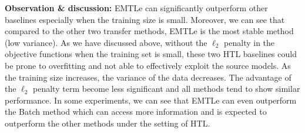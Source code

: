 \textbf{Observation \& discussion:} EMTLe can significantly outperform other baselines especially when the training size is small. Moreover, we can see that compared to the other two transfer methods, EMTLe is the most stable method (low variance). As we have discussed above, without the $\ell_2$ penalty in the objective functions when the training set is small, these two HTL baselines could be prone to overfitting and not able to effectively exploit the source models.
As the training size increases, the variance of the data decreases. The advantage of the $\ell_2$ penalty term become less significant and all methods tend to show similar performance.
In some experiments, we can see that EMTLe can even outperform the Batch method which can access more information and is expected to outperform the other methods under the setting of HTL.